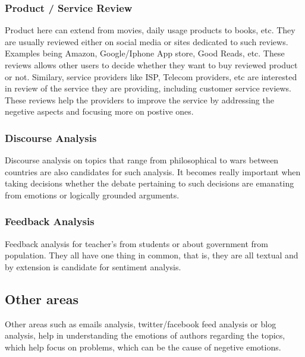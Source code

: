 \documentclass[conference]{IEEEtran}
\begin{document}
\subsubsection{Product / Service Review}
    Product here can extend from movies, daily usage products to books, etc. They are usually reviewed either on social media or sites dedicated to such reviews. Examples being Amazon, Google/Iphone App store, Good Reads, etc. These reviews allows other users to decide whether they want to buy reviewed product or not. Similary, service providers like ISP, Telecom providers, etc are interested in review of the service they are providing, including customer service reviews. These reviews help the providers to improve the service by addressing the negetive aspects and focusing more on postive ones. \\
\subsubsection{Discourse Analysis} 
    Discourse analysis on topics that range from philosophical to wars between countries are also candidates for such analysis. It becomes really important when taking decisions whether the debate pertaining to such decisions are emanating from emotions or logically grounded arguments. \\
\subsubsection{Feedback Analysis} 
    Feedback analysis for teacher's from students or about government from population. They all have one thing in common, that is, they are all textual and by extension is candidate for sentiment analysis. \\
\subsection{Other areas}
    Other areas such as emails analysis, twitter/facebook feed analysis or blog analysis, help in understanding the emotions of authors regarding the topics, which help focus on problems, which can be the cause of negetive emotions. \\
\end{document}
